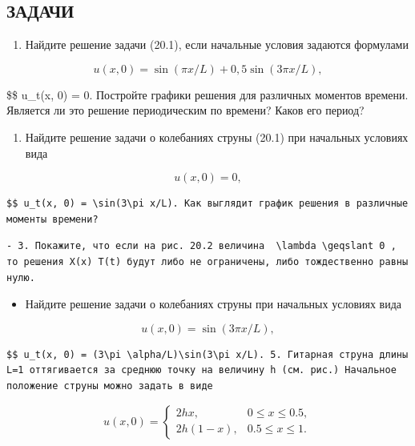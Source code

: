 \documentclass[
  ukrainian,
]{article}
\providecommand{\tightlist}{%
  \setlength{\itemsep}{0pt}\setlength{\parskip}{0pt}}
\begin{document}
\subsection{ЗАДАЧИ}\label{ux437ux430ux434ux430ux447ux438-2}

\begin{enumerate}
\def\labelenumi{\arabic{enumi}.}
\tightlist
\item
  Найдите решение задачи (20.1), если начальные условия задаются
  формулами
\end{enumerate}

\[
u(x, 0) = \sin(\pi x/L) + 0,5 \sin(3\pi x/L),
\]

\$\$ u\_t(x, 0) = 0. Постройте графики решения для различных моментов
времени. Является ли это решение периодическим по времени? Каков его
период?

\begin{enumerate}
\def\labelenumi{\arabic{enumi}.}
\setcounter{enumi}{1}
\tightlist
\item
  Найдите решение задачи о колебаниях струны (20.1) при начальных
  условиях вида
\end{enumerate}

\[
u(x, 0) = 0,
\]

\begin{verbatim}
$$ u_t(x, 0) = \sin(3\pi x/L). Как выглядит график решения в различные моменты времени?
\end{verbatim}

\begin{verbatim}
- 3. Покажите, что если на рис. 20.2 величина  \lambda \geqslant 0 , то решения X(x) T(t) будут либо не ограничены, либо тождественно равны нулю.
\end{verbatim}

\begin{itemize}
\tightlist
\item
  Найдите решение задачи о колебаниях струны при начальных условиях вида
\end{itemize}

\[
u(x, 0) = \sin(3\pi x/L),
\]

\begin{verbatim}
$$ u_t(x, 0) = (3\pi \alpha/L)\sin(3\pi x/L). 5. Гитарная струна длины L=1 оттягивается за среднюю точку на величину h (см. рис.) Начальное положение струны можно задать в виде
\end{verbatim}

\[
u(x, 0) = \begin{cases} 2hx, & 0 \le x \le 0.5, \\ 2h(1-x), & 0.5 \le x \le 1. \end{cases}
\]
\end{document}
